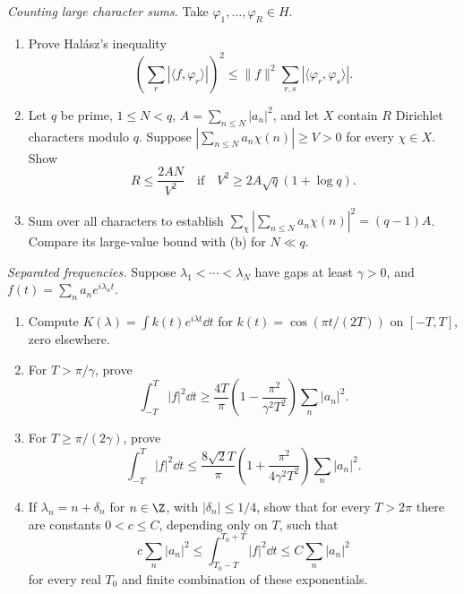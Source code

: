 \begin{exercise}[$\star\star$]\label{pb:halasz}
\emph{Counting large character sums.} Take $\varphi_1,\ldots,\varphi_R\in H$.
\begin{enumerate}[label=(\alph*)]
\item Prove Halász's inequality
\[\left(\sum_r|\langle f,\varphi_r\rangle|\right)^2\le\|f\|^2\sum_{r,s}|\langle\varphi_r,\varphi_s\rangle|.\]
\item Let $q$ be prime, $1\le N<q$, $A=\sum_{n\le N}|a_n|^2$, and let $X$ contain $R$ Dirichlet characters modulo $q$. Suppose $|\sum_{n\le N}a_n\chi(n)|\ge V>0$ for every $\chi\in X$. Show
\[R\le\frac{2AN}{V^2}\quad\text{if}\quad V^2\ge2A\sqrt q(1+\log q).\]
\item Sum over all characters to establish $\sum_\chi|\sum_{n\le N}a_n\chi(n)|^2=(q-1)A$. Compare its large-value bound with (b) for $N\ll q$.
\end{enumerate}
\end{exercise}
\begin{exercise}[$\star\star\star$]\label{pb:ingham}
\emph{Separated frequencies.} Suppose $\lambda_1<\cdots<\lambda_N$ have gaps at least $\gamma>0$, and $f(t)=\sum_na_ne^{i\lambda_nt}$.
\begin{enumerate}[label=(\alph*)]
\item Compute $K(\lambda)=\int k(t)e^{i\lambda t}\dd t$ for $k(t)=\cos(\pi t/(2T))$ on $[-T,T]$, zero elsewhere.
\item For $T>\pi/\gamma$, prove
\[\int_{-T}^T|f|^2\dd t\ge\frac{4T}{\pi}\left(1-\frac{\pi^2}{\gamma^2T^2}\right)\sum_n|a_n|^2.\]
\item For $T\ge\pi/(2\gamma)$, prove
\[\int_{-T}^T|f|^2\dd t\le\frac{8\sqrt2T}{\pi}\left(1+\frac{\pi^2}{4\gamma^2T^2}\right)\sum_n|a_n|^2.\]
\item If $\lambda_n=n+\delta_n$ for $n\in\Z$, with $|\delta_n|\le1/4$, show that for every $T>2\pi$ there are constants $0<c\le C$, depending only on $T$, such that
\[c\sum_n|a_n|^2\le\int_{T_0-T}^{T_0+T}|f|^2\dd t\le C\sum_n|a_n|^2\]
for every real $T_0$ and finite combination of these exponentials.
\end{enumerate}
\end{exercise}
